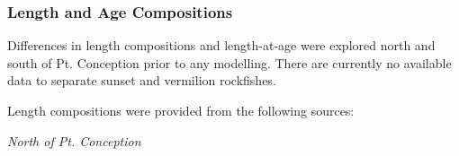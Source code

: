 \documentclass[11pt,
  english,
  a4paper,
]{article}
\begin{document}
\leavevmode\tagmcend\tagstructend


\hypertarget{length-and-age-compositions}{%
\subsubsection{Length and Age Compositions}\label{length-and-age-compositions}}

\leavevmode\tagmcend\tagstructend

Differences in length compositions and length-at-age were explored north and south of Pt. Conception prior to any modelling. There are currently no available data to separate sunset and vermilion rockfishes.

Length compositions were provided from the following sources:

\emph{North of Pt. Conception}

\end{document}
